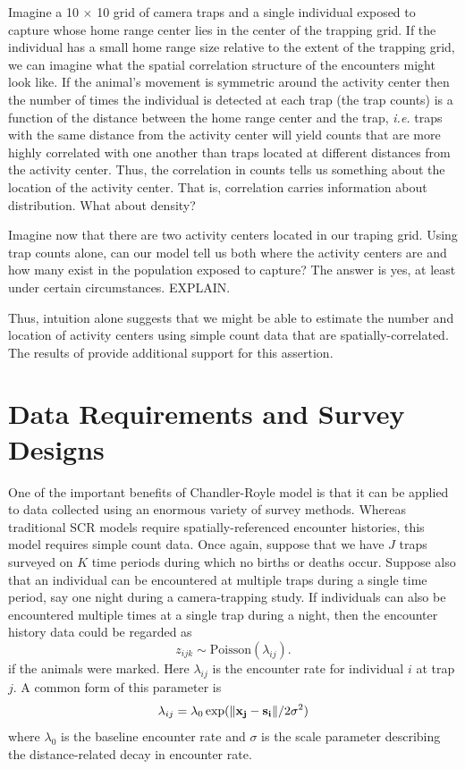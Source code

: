 Imagine a 10 $\times$ 10 grid of camera traps and a single individual
exposed to capture whose home range center lies in the center of the
trapping grid. If the individual has a small home range size relative
to the extent of the trapping grid, we can imagine what the
spatial correlation structure of the encounters might look
like. If the animal's movement is symmetric around the activity center
then the number of times the individual is detected at each
trap (the trap counts) is a function of the distance between the home
range center and the trap, \emph{i.e.} traps with the same distance from the
activity center will yield counts that are more highly correlated with
one another than traps located at different distances from the
activity center. Thus, the correlation in counts tells us something
about the location of the activity center. That is, correlation
carries information about distribution. What about density?

Imagine now that there are two activity centers located in our traping
grid. Using trap counts alone, can our model tell us both where the
activity centers are and how many exist in the population exposed to
capture? The answer is yes, at least under certain circumstances.
EXPLAIN.

Thus, intuition alone suggests that we might be able to estimate the
number and location of activity centers using simple count data that
are spatially-correlated. The results of
\citet{chandler_royle:2012} provide additional support for this
assertion.


\section{Data Requirements and Survey Designs}

One of the important benefits of Chandler-Royle model is that it
can be applied to data collected using an enormous variety of survey
methods. Whereas traditional SCR models require spatially-referenced
encounter histories, this model requires simple count data. Once
again, suppose that we have $J$ traps surveyed on $K$ time periods
during which no births or deaths occur. Suppose also that an
individual can be encountered at multiple traps during a single time
period, say one night during a camera-trapping study. If individuals
can also be encountered multiple times at a single trap during a
night, then the encounter history data could be regarded as
\begin{equation}
 z_{ijk} \sim \mbox{Poisson}(\lambda_{ij}).
\label{eq.latentPoisson}
\end{equation}
if the animals were marked. Here $\lambda_{ij}$ is the encounter rate
for individual $i$ at trap $j$. A common form of this parameter is
\[
\lambda_{ij} = \lambda_0 \exp(\| {\bf x_j - s_i} \| / 2\sigma^2)
\]
where $\lambda_0$ is the baseline encounter rate and $\sigma$ is the
scale parameter describing the distance-related decay in encounter
rate.

